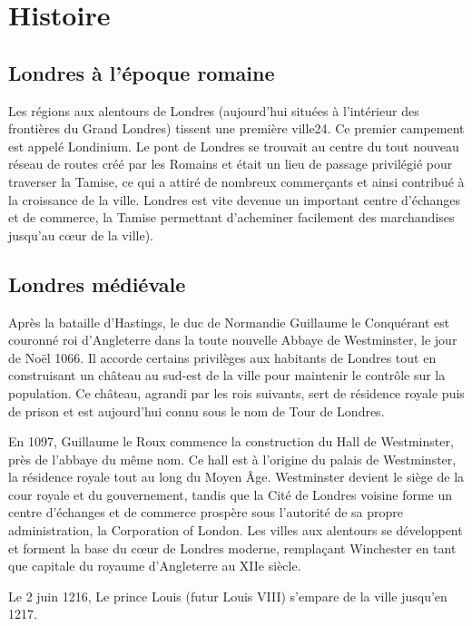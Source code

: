 \documentclass{article}
\begin{document}
\newpage
\section{Histoire}
\subsection{Londres à l'époque romaine}

Les régions aux alentours de Londres (aujourd'hui situées à l'intérieur des frontières du Grand Londres) tissent une première ville24. Ce premier campement est appelé Londinium. Le pont de Londres se trouvait au centre du tout nouveau réseau de routes créé par les Romains et était un lieu de passage privilégié pour traverser la Tamise, ce qui a attiré de nombreux commerçants et ainsi contribué à la croissance de la ville. Londres est vite devenue un important centre d'échanges et de commerce, la Tamise permettant d'acheminer facilement des marchandises jusqu'au cœur de la ville).

\subsection{Londres médiévale}
Après la bataille d'Hastings, le duc de Normandie Guillaume le Conquérant est couronné roi d'Angleterre dans la toute nouvelle Abbaye de Westminster, le jour de Noël 1066. Il accorde certains privilèges aux habitants de Londres tout en construisant un château au sud-est de la ville pour maintenir le contrôle sur la population. Ce château, agrandi par les rois suivants, sert de résidence royale puis de prison et est aujourd'hui connu sous le nom de Tour de Londres.

En 1097, Guillaume le Roux commence la construction du Hall de Westminster, près de l'abbaye du même nom. Ce hall est à l'origine du palais de Westminster, la résidence royale tout au long du Moyen Âge. Westminster devient le siège de la cour royale et du gouvernement, tandis que la Cité de Londres voisine forme un centre d'échanges et de commerce prospère sous l'autorité de sa propre administration, la Corporation of London. Les villes aux alentours se développent et forment la base du cœur de Londres moderne, remplaçant Winchester en tant que capitale du royaume d'Angleterre au XIIe siècle.

Le 2 juin 1216, Le prince Louis (futur Louis VIII) s'empare de la ville jusqu'en 1217.
\end{document}

